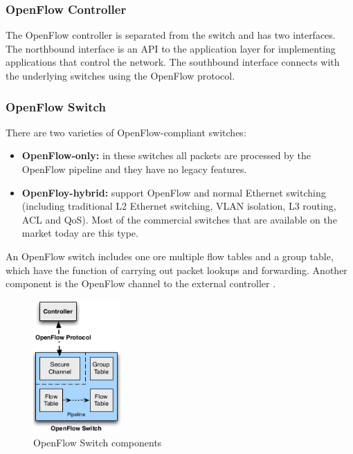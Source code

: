 \subsubsection{OpenFlow Controller}

The OpenFlow controller is separated from the switch and has two interfaces. The northbound interface is an API to the application layer for implementing applications that control the network. The southbound interface connects with the underlying switches using the OpenFlow protocol.

\subsubsection{OpenFlow Switch}

There are two varieties of OpenFlow-compliant switches: \cite{ofspecification}
\begin{itemize}
\item \textbf{OpenFlow-only:} in these switches all packets are processed by the OpenFlow pipeline and they have no legacy features.
\item \textbf{OpenFloy-hybrid:} support OpenFlow and normal Ethernet switching (including traditional L2 Ethernet switching, VLAN isolation, L3 routing, ACL and QoS). Most of the commercial switches that are available on the market today are this type.
\end{itemize}

An OpenFlow switch includes one ore multiple flow tables and a group table, which have the function of carrying out packet lookups and forwarding. Another component is the OpenFlow channel to the external controller \cite{ofspecification}.

\begin{figure}[H]
\centering
\includegraphics[width=0.3\textwidth]{images/fundamentals/openflow_switch_components.png}
\caption{OpenFlow Switch components}
\end{figure}

